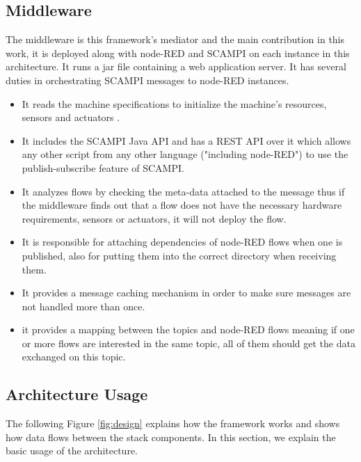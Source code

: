 \subsection{Middleware}
The middleware is this framework's mediator and the main contribution in this work, it is deployed along with node-RED and SCAMPI on each instance in this architecture. It runs a jar file containing a web application server. It has several duties in orchestrating  SCAMPI messages to node-RED instances.
\begin{itemize}
\item It reads the machine specifications to initialize the machine's resources, sensors and actuators 	.
\item It includes the SCAMPI Java API and has a REST API over it which allows any other script from any other language ("including node-RED") to use the publish-subscribe feature of SCAMPI.
\item It analyzes  flows by checking the meta-data  attached to the message thus if the middleware finds out that a flow does not have the necessary hardware requirements, sensors or actuators, it will not deploy the flow. 
\item It is responsible for attaching dependencies of  node-RED flows when one is published, also for putting them into the correct directory when receiving them.
\item It provides a message caching mechanism in order to make sure messages are not handled more than once.
\item it provides a mapping between the topics and node-RED flows meaning if one or more flows are interested in the same topic, all of them should get the data exchanged on this topic.
 \end{itemize}

\subsection{Architecture Usage} \label{subsec:usage}
The following Figure \ref{fig:design} explains how the framework works and shows how data flows between the stack components. In this section, we explain the basic usage of the architecture.

